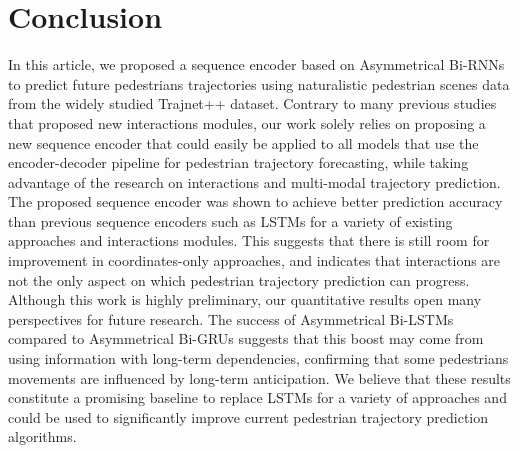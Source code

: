 \documentclass[conference]{IEEEtran}
\begin{document}
\section{Conclusion}

In this article, we proposed a sequence encoder based on Asymmetrical Bi-RNNs to predict future pedestrians trajectories using naturalistic pedestrian scenes data from the widely studied Trajnet++ dataset. Contrary to many previous studies that proposed new interactions modules, our work solely relies on proposing a new sequence encoder that could easily be applied to all models that use the encoder-decoder pipeline for pedestrian trajectory forecasting, while taking advantage of the research on interactions and multi-modal trajectory prediction. The proposed sequence encoder was shown to achieve better prediction accuracy than previous sequence encoders such as LSTMs for a variety of existing approaches and interactions modules. This suggests that there is still room for improvement in coordinates-only approaches, and indicates that interactions are not the only aspect on which pedestrian trajectory prediction can progress.
Although this work is highly preliminary, our quantitative results open many perspectives for future research. The success of Asymmetrical Bi-LSTMs compared to Asymmetrical Bi-GRUs suggests that this boost may come from using information with long-term dependencies, confirming that some pedestrians movements are influenced by long-term anticipation. We believe that these results constitute a promising baseline to replace LSTMs for a variety of approaches and could be used to significantly improve current pedestrian trajectory prediction algorithms.


 

\end{document}
